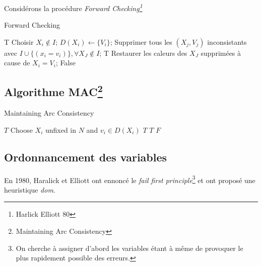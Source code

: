 Considérons la procédure \em{Forward Checking}\footnote{Harlick Elliott 80}

\begin{algorithm}
    \caption{Forward Checking}
    \label{algo_fc}
    \begin{algorithmic}[1]
                \State \Return T
            \EndIf
            \State Choisir $X_i \not \in I$;
                \State $D(X_i) \gets \{V_i\}$;
                \State Supprimer tous les $(X_j, V_j)$ inconsistants avec $I \cup \{(x_i = v_i)\}, \forall X_J \not \in I$;
                        \State \Return T
                    \EndIf
                \EndIf
                \State Restaurer les caleurs des $X_J$ supprimées à cause de $X_i = V_i$;
            \EndFor
            \State \Return False
        \EndFunction
    \end{algorithmic}
\end{algorithm}

\subsection{Algorithme MAC\footnote{Maintaining Arc Consistency}}

\begin{algorithm}
    \caption{Maintaining Arc Consistency}
    \label{alg_mac}
    \begin{algorithmic}[1]
                    \State \Return $T$
                \EndIf
                \State Choose $X_i$ unfixed in $N$ and $v_i \in D(X_i)$
                    \State \Return $T$
                \EndIf
                    \State \Return $T$
                \EndIf
            \EndIf
            \State \Return $F$
        \EndFunction
    \end{algorithmic}
\end{algorithm}

\subsection{Ordonnancement des variables}

En 1980, Haralick et Elliott ont ennoncé le \emph{fail first principle}\footnote{On cherche à
assigner d'abord les variables étant à même de provoquer le plus rapidement possible des erreurs.}
et ont proposé une heuristique \emph{dom}.

